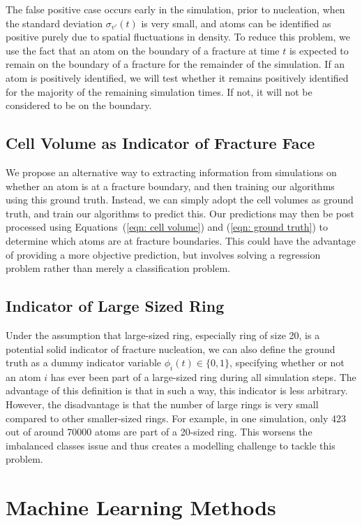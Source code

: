 The false positive case occurs early in the simulation, prior to nucleation, when the standard deviation $\sigma_{v'}(t)$ is very small, and atoms can be identified as positive purely due to spatial fluctuations in density.  To reduce this problem, we use the fact that an atom on the boundary of a fracture at time $t$ is expected to remain on the boundary of a fracture for the remainder of the simulation.  If an atom is positively identified, we will test whether it remains positively identified for the majority of the remaining simulation times.  If not, it will not be considered to be on the boundary.

\subsection{Cell Volume as Indicator of Fracture Face}

We propose an alternative way to extracting information from simulations on whether an atom is at a fracture boundary, and then training our algorithms using this ground truth.  Instead, we can simply adopt the cell volumes as ground truth, and train our algorithms to predict this.  Our predictions may then be post processed using Equations~(\ref{eqn: cell volume}) and (\ref{eqn: ground truth}) to determine which atoms are at fracture boundaries.  This could have the advantage of providing a more objective prediction, but involves solving a regression problem rather than merely a classification problem.

\subsection{Indicator of Large Sized Ring}

Under the assumption that large-sized ring, especially ring of size 20, is a potential solid indicator of fracture nucleation, we can also define the ground truth as a dummy indicator variable $\phi_i(t) \in\{0,1\}$, specifying whether or not an atom $i$ has ever been part of a large-sized ring during all simulation steps. The advantage of this definition is that in such a way, this indicator is less arbitrary. However, the disadvantage is that the number of large rings is very small compared to other smaller-sized rings. For example, in one simulation, only 423 out of around 70000 atoms are part of a 20-sized ring. This worsens the imbalanced classes issue and thus creates a modelling challenge to tackle this problem.


\section{Machine Learning Methods}

